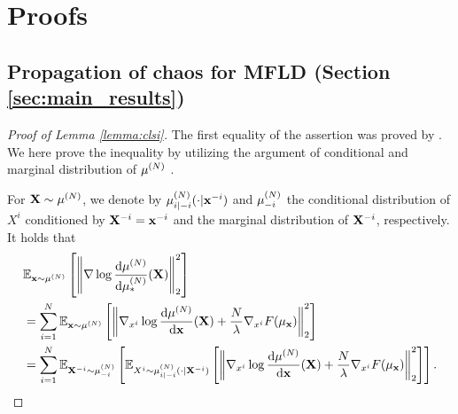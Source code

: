 \section{Proofs}\label{sec:proofs}
\subsection{Propagation of chaos for MFLD (Section \ref{sec:main_results})}\label{subsec:poc_proof}
\begin{proof}[Proof of Lemma \ref{lemma:clsi}]
    The first equality of the assertion was proved by \citet{nitanda2024improved}. We here prove the inequality by utilizing the argument of conditional and marginal distribution of $\pow[\mu,N]$ \cite{chen2022uniform}.
    
    For $\vX \sim \pow[\mu,N]$, we denote by $\pow[\mu,N]_{i|-i}(\cdot | \vx^{-i})$ and $\pow[\mu,N]_{-i}$ the conditional distribution of $X^i$ conditioned by $\mathbf{X}^{-i}=\mathbf{x}^{-i}$ and the marginal distribution of $\mathbf{X}^{-i}$, respectively.
    It holds that 
    \begin{align} 
        &\bE_{\vx \sim \pow[\mu,N]}\left[ \left\| \nabla \log \frac{\rd \pow[\mu,N]}{\rd \pow[\mu,N]_*}(\vX) \right\|_2^2\right] \notag\\
        &= \sum_{i=1}^N \bE_{\vx \sim \pow[\mu,N]}\left[ \left\| \nabla_{x^i} \log \frac{\rd \pow[\mu,N]}{\rd \vx}(\vX) + \frac{N}{\lambda}\nabla_{x^i}F(\mu_\vx)\right\|_2^2\right] \notag\\
        &= \sum_{i=1}^N \bE_{\vX^{-i} \sim \pow[\mu,N]_{-i}} \left[ \bE_{X^i \sim \pow[\mu,N]_{i|-i}(\cdot | \vX^{-i})}\left[ \left\| \nabla_{x^i} \log \frac{\rd \pow[\mu,N]}{\rd \vx}(\vX) + \frac{N}{\lambda}\nabla_{x^i}F(\mu_\vx)\right\|_2^2 \right]\right]. \label{eq:fisher_div}
    \end{align}


\end{proof}
